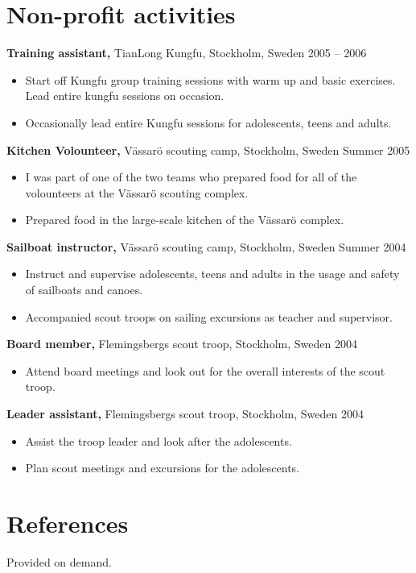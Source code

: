 \documentclass[margin]{res}
\begin{document}
\begin{resume}
\section{Non-profit activities}
{\bf Training assistant,} TianLong Kungfu, Stockholm, Sweden \hfill 2005 -- 2006
\begin{itemize} \itemsep -2pt
\item Start off Kungfu group training sessions with warm up and basic exercises. Lead entire kungfu sessions on occasion.
\item Occasionally lead entire Kungfu sessions for adolescents, teens and adults.
\end{itemize}

{\bf Kitchen Volounteer,} Vässarö scouting camp, Stockholm, Sweden \hfill Summer 2005
\begin{itemize} \itemsep -2pt
\item I was part of one of the two teams who prepared food for all of the volounteers at the Vässarö scouting complex.
\item Prepared food in the large-scale kitchen of the Vässarö complex.
\end{itemize}

{\bf Sailboat instructor,} Vässarö scouting camp, Stockholm, Sweden \hfill Summer 2004
\begin{itemize} \itemsep -2pt
\item Instruct and supervise adolescents, teens and adults in the usage and safety of sailboats and canoes.
\item Accompanied scout troops on sailing excursions as teacher and supervisor.
\end{itemize}

{\bf Board member,} Flemingsbergs scout troop, Stockholm, Sweden \hfill 2004
\begin{itemize} \itemsep -2pt
\item Attend board meetings and look out for the overall interests of the scout troop.
\end{itemize}
{\bf Leader assistant,} Flemingsbergs scout troop, Stockholm, Sweden \hfill 2004
\begin{itemize} \itemsep -2pt
\item Assist the troop leader and look after the adolescents.
\item Plan scout meetings and excursions for the adolescents.
\end{itemize}

\section{References}
Provided on demand.

\end{resume}
\end{document}
